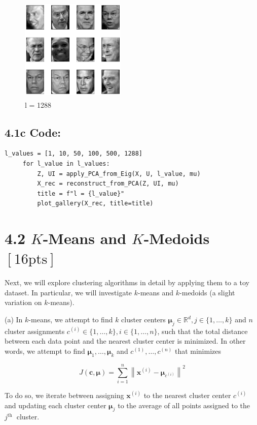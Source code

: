 \documentclass[10pt]{article}
\begin{document}
\begin{figure}[H]
  \centering
  \includegraphics[width=5cm, height=5cm]{images/4.1c_6.png}
  \caption{l = 1288}
  \label{fig:faces}
\end{figure}

\subsection*{4.1c Code:}
\begin{verbatim}
l_values = [1, 10, 50, 100, 500, 1288]
     for l_value in l_values:
         Z, UI = apply_PCA_from_Eig(X, U, l_value, mu)
         X_rec = reconstruct_from_PCA(Z, UI, mu)
         title = f"l = {l_value}"
         plot_gallery(X_rec, title=title)
\end{verbatim} 

\section*{4.2 $K$-Means and $K$-Medoids $[16 \mathrm{pts}]$}
Next, we will explore clustering algorithms in detail by applying them to a toy dataset. In particular, we will investigate $k$-means and $k$-medoids (a slight variation on $k$-means).


(a) In $k$-means, we attempt to find $k$ cluster centers $\boldsymbol{\mu}_{j} \in \mathbb{R}^{d}, j \in\{1, \ldots, k\}$ and $n$ cluster assignments $c^{(i)} \in\{1, \ldots, k\}, i \in\{1, \ldots, n\}$, such that the total distance between each data point and the nearest cluster center is minimized. In other words, we attempt to find $\boldsymbol{\mu}_{1}, \ldots, \boldsymbol{\mu}_{k}$ and $c^{(1)}, \ldots, c^{(n)}$ that minimizes

$$
J(\boldsymbol{c}, \boldsymbol{\mu})=\sum_{i=1}^{n}\left\|\boldsymbol{x}^{(i)}-\boldsymbol{\mu}_{c^{(i)}}\right\|^{2}
$$

To do so, we iterate between assigning $\boldsymbol{x}^{(i)}$ to the nearest cluster center $c^{(i)}$ and updating each cluster center $\boldsymbol{\mu}_{j}$ to the average of all points assigned to the $j^{\text {th }}$ cluster.
\end{document}
